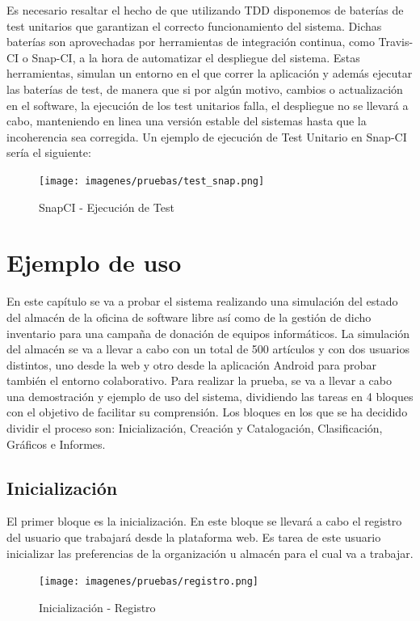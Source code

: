 \documentclass[a4paper,11pt]{book}
\begin{document}
Es necesario resaltar el hecho de que utilizando TDD disponemos de baterías de test unitarios que garantizan el correcto funcionamiento del sistema. Dichas baterías son aprovechadas por herramientas de integración continua,  como Travis-CI o Snap-CI, a la hora de automatizar el despliegue del sistema. Estas herramientas, simulan un entorno en el que correr la aplicación y además ejecutar las baterías de test, de manera que si por algún motivo, cambios o actualización en el software, la ejecución de los test unitarios falla, el despliegue no se llevará a cabo, manteniendo en linea una versión estable del sistemas hasta que la incoherencia sea corregida. Un ejemplo de ejecución de Test Unitario en Snap-CI sería el siguiente:

\begin{figure}[H] 
\centering 
\texttt{[image: imagenes/pruebas/test\_snap.png]}
\caption{ SnapCI - Ejecución de Test\cite{snap}}
\end{figure}


\section{Ejemplo de uso}
En este capítulo se va a probar el sistema realizando una simulación del estado del almacén de la oficina de software libre así como de la gestión de dicho inventario para una campaña de donación de equipos informáticos. La simulación del almacén se va a llevar a cabo con un total de 500 artículos y con dos usuarios distintos, uno desde la web y otro desde la aplicación Android para probar también el entorno colaborativo.   Para realizar la prueba, se va a llevar a cabo una demostración y ejemplo de uso del sistema, dividiendo las tareas en 4 bloques con el objetivo de facilitar su comprensión. Los bloques en los que se ha decidido dividir el proceso son: Inicialización, Creación y Catalogación, Clasificación, Gráficos e Informes. 

\subsection{Inicialización}
El primer bloque es la inicialización. En este bloque se llevará a cabo el registro del usuario que trabajará desde la plataforma web. Es tarea de este usuario inicializar las preferencias de la organización u almacén para el cual va a trabajar. 

\begin{figure}[H] 
\centering 
\texttt{[image: imagenes/pruebas/registro.png]}
\caption{ Inicialización - Registro}
\end{figure}
\end{document}
